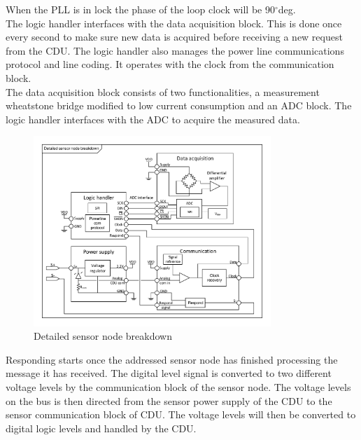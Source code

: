 When the PLL is in lock the phase of the loop clock will be 90$^{\circ}$deg.\\
The logic handler interfaces with the data acquisition block. This is done once every second to make sure new data is acquired before receiving a new request from the CDU. The logic handler also manages the power line communications protocol and line coding. It operates with the clock from the communication block.\\
The data acquisition block consists of two functionalities, a measurement wheatstone bridge modified to low current consumption and an ADC block. The logic handler interfaces with the ADC to acquire the measured data.
\begin{figure}[H]
	\centering
	\includegraphics[width=0.8\textwidth]{billeder/11ProjectDescription/SN_detailed_design}
	\caption{Detailed sensor node breakdown}
	\label{fig:SN_detailed}
\end{figure}
Responding starts once the addressed sensor node has finished processing the message it has received. The digital level signal is converted to two different voltage levels by the communication block of the sensor node. The voltage levels on the bus is then directed from the sensor power supply of the CDU to the sensor communication block of CDU. The voltage levels will then be converted to digital logic levels and handled by the CDU.

